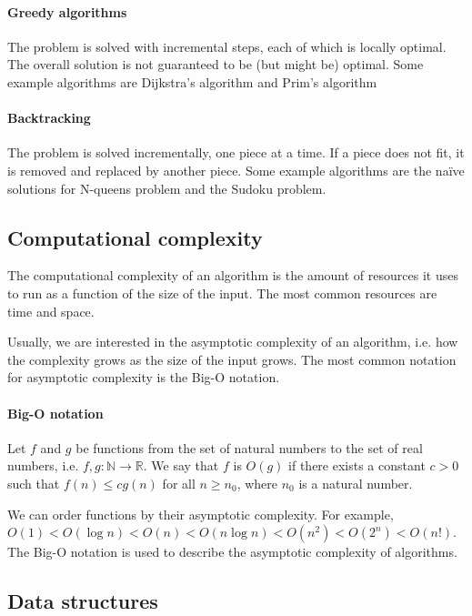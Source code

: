 \paragraph{Greedy algorithms}  The problem is solved with incremental steps, each of which
is locally optimal.  The overall solution is not guaranteed to be (but might be) optimal.  Some example
algorithms are Dijkstra's algorithm and Prim's algorithm

\paragraph{Backtracking}  The problem is solved incrementally, one piece at a time.  If a
piece does not fit, it is removed and replaced by another piece.  Some example algorithms
are the naïve solutions for N-queens problem and the Sudoku problem.

\subsection{Computational complexity}

The computational complexity of an algorithm is the amount of resources it uses to
run as a function of the size of the input.  The most common resources are time and
space.

Usually, we are interested in the asymptotic complexity of an algorithm, i.e. how
the complexity grows as the size of the input grows.  The most common notation for
asymptotic complexity is the Big-O notation.

\paragraph{Big-O notation}  Let $f$ and $g$ be functions from the set of natural numbers
to the set of real numbers, i.e. $f, g : \mathbb{N} \rightarrow \mathbb{R}$.  We say that $f$ is
$O(g)$ if there exists a constant $c > 0$ such that $f(n) \leq c g(n)$ for all $n \geq
n_0$, where $n_0$ is a natural number.

We can order functions by their asymptotic complexity.  For example, $O(1) < O(\log n) <
O(n) < O(n \log n) < O(n^2) < O(2^n) < O(n!)$.  The Big-O notation is used to describe
the asymptotic complexity of algorithms.

\subsection{Data structures}

